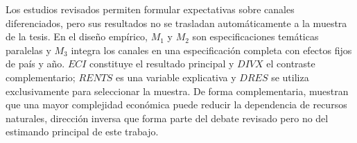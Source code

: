 \documentclass[../../TFM.tex]{subfiles}
\begin{document}
	Los estudios revisados permiten formular expectativas sobre canales
	diferenciados, pero sus resultados no se trasladan automáticamente a la
	muestra de la tesis. En el diseño empírico, $M_1$ y $M_2$ son especificaciones
	temáticas paralelas y $M_3$ integra los canales en una especificación completa
	con efectos fijos de país y año. $ECI$ constituye el resultado principal y
	$DIVX$ el contraste complementario; $RENTS$ es una variable explicativa y
	$DRES$ se utiliza exclusivamente para seleccionar la muestra. De forma
	complementaria, \textcite{Destek2023} muestran que una mayor complejidad
	económica puede reducir la dependencia de recursos naturales, dirección
	inversa que forma parte del debate revisado pero no del estimando principal de
	este trabajo.

\end{document}
